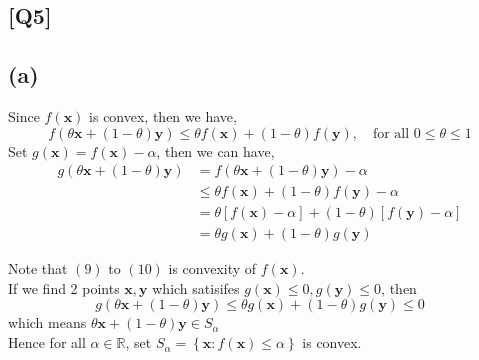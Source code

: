 \documentclass[12pt, a4 paper]{article}
\begin{document}
    \begin{framed}
    \section{[Q5]}
    \subsection{(a)}
            Since $f(\boldsymbol{x})$ is convex, then we have,
        $$
        f(\theta \boldsymbol{x} + (1-\theta) \boldsymbol{y}) \leq \theta f(\boldsymbol{x})
         + (1-\theta) f(\boldsymbol{y}), \quad \text{for all } 0 \leq \theta \leq 1
        $$
        \indent Set $g(\boldsymbol{x}) = f(\boldsymbol{x}) - \alpha$, then we can have,
        \begin{align}
            g(\theta \boldsymbol{x} + (1-\theta) \boldsymbol{y} ) &= f(\theta \boldsymbol{x} 
            + (1-\theta) \boldsymbol{y}) -\alpha \\
            &\leq \theta f(\boldsymbol{x}) + (1-\theta) f(\boldsymbol{y}) - \alpha \\
            &= \theta \left[ f(\boldsymbol{x}) - \alpha \right] + (1-\theta) \left[ f(\boldsymbol{y})
             - \alpha \right] \\
            &= \theta g(\boldsymbol{x}) + (1-\theta) g(\boldsymbol{y})
        \end{align}
        
        Note that $(9)$ to $(10)$ is convexity of $f(\boldsymbol{x})$. \\
        \indent If we find 2 points $\boldsymbol{x}, \boldsymbol{y}$ 
        which satisifes $g(\boldsymbol{x}) \leq 0, g(\boldsymbol{y}) \leq 0$, then 
        $$
        g(\theta \boldsymbol{x} + (1-\theta) \boldsymbol{y}) \leq \theta g(\boldsymbol{x})
         + (1-\theta)g(\boldsymbol{y}) \leq 0
        $$
        \indent which means $\theta \boldsymbol{x} + (1-\theta) \boldsymbol{y} \in S_{\alpha}$ \\
        \indent Hence for all $\alpha \in \mathbb{R}$, set $S_{\alpha} = \left\{ 
            \boldsymbol{x}: f(\boldsymbol{x}) \leq \alpha
        \right\}$ is convex.


\end{framed}
\end{document}
